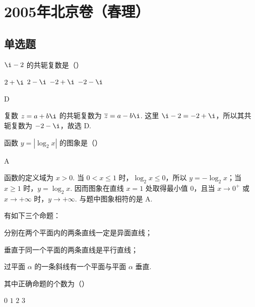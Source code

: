 \chapter{2005年北京卷（春理）}

\section{单选题}

\begin{problem}
\(\i-2\) 的共轭复数是（\quad）

\choices
    {\(2+\i\)}
    {\(2-\i\)}
    {\(-2+\i\)}
    {\(-2-\i\)}
\end{problem}

\begin{answer}
D
\end{answer}

\begin{solution}
复数 \(z=a+b\i\) 的共轭复数为 \(\overline{z}=a-b\i\). 这里 \(\i-2=-2+\i\)，所以其共轭复数为 \(-2-\i\)，故选 D.
\end{solution}

\begin{problem}
函数 \(y=|\log_2 x|\) 的图象是（\quad）

    {}
    {}
    {}
\end{problem}

\begin{answer}
A
\end{answer}

\begin{solution}
函数的定义域为 \(x>0\). 当 \(0<x\leqslant1\) 时，\(\log_2x\leqslant0\)，所以 \(y=-\log_2x\)；当 \(x\geqslant1\) 时，\(y=\log_2x\). 因而图象在直线 \(x=1\) 处取得最小值 \(0\)，且当 \(x\to0^+\) 或 \(x\to+\infty\) 时，\(y\to+\infty\). 与题中图象相符的是 A.
\end{solution}

\begin{problem}
有如下三个命题：

\begin{circlelist}
\item 分别在两个平面内的两条直线一定是异面直线；
\item 垂直于同一个平面的两条直线是平行直线；
\item 过平面 \(\alpha\) 的一条斜线有一个平面与平面 \(\alpha\) 垂直.
\end{circlelist}

其中正确命题的个数为（\quad）

\choices
    {\(0\)}
    {\(1\)}
    {\(2\)}
    {\(3\)}
\end{problem}

